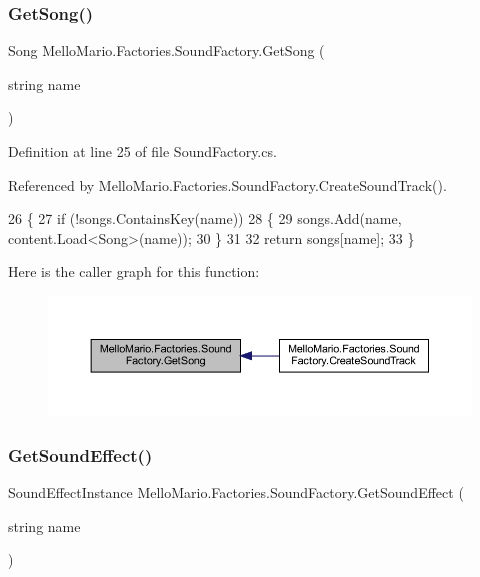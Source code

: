 \subsubsection{Get\+Song()}
{\footnotesize\ttfamily Song Mello\+Mario.\+Factories.\+Sound\+Factory.\+Get\+Song (\begin{DoxyParamCaption}\item[{string}]{name }\end{DoxyParamCaption})\hspace{0.3cm}{\ttfamily [private]}}



Definition at line 25 of file Sound\+Factory.\+cs.



Referenced by Mello\+Mario.\+Factories.\+Sound\+Factory.\+Create\+Sound\+Track().


\begin{DoxyCode}
26         \{
27             \textcolor{keywordflow}{if} (!songs.ContainsKey(name))
28             \{
29                 songs.Add(name, content.Load<Song>(name));
30             \}
31 
32             \textcolor{keywordflow}{return} songs[name];
33         \}
\end{DoxyCode}
Here is the caller graph for this function\+:
\nopagebreak
\begin{figure}[H]
\begin{center}
\leavevmode
\includegraphics[width=350pt]{classMelloMario_1_1Factories_1_1SoundFactory_ab9247506e33819710479a9f77c6da6d8_icgraph}
\end{center}
\end{figure}
\mbox{\label{classMelloMario_1_1Factories_1_1SoundFactory_a72626a611369e04547b8001970e80407}} 
\subsubsection{Get\+Sound\+Effect()}
{\footnotesize\ttfamily Sound\+Effect\+Instance Mello\+Mario.\+Factories.\+Sound\+Factory.\+Get\+Sound\+Effect (\begin{DoxyParamCaption}\item[{string}]{name }\end{DoxyParamCaption})\hspace{0.3cm}{\ttfamily [private]}}



